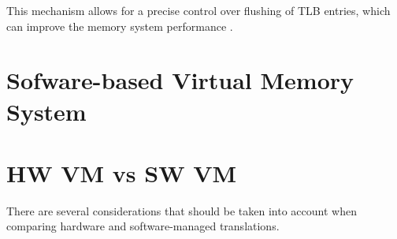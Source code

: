This mechanism allows for a precise control over flushing of TLB entries, which can improve the
memory system performance \cite{RISCVInstructionSet}.










\section{Sofware-based Virtual Memory System}






\section{HW VM vs SW VM}
There are several considerations that should be taken into account when comparing hardware and
software-managed translations.

